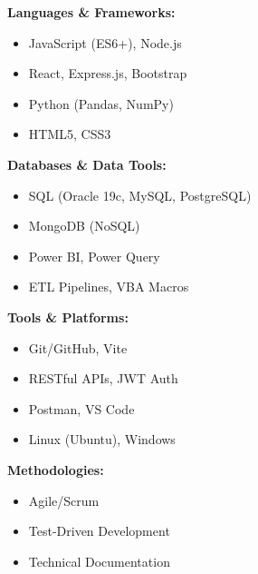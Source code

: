 \documentclass[10pt,letterpaper]{article}
\begin{document}
\vspace{0.4cm}

\vspace{0.3cm}

\noindent
\begin{minipage}[t]{0.48\textwidth}
\textbf{Languages \& Frameworks:}
\begin{itemize}
    \item JavaScript (ES6+), Node.js
    \item React, Express.js, Bootstrap
    \item Python (Pandas, NumPy)
    \item HTML5, CSS3
\end{itemize}

\vspace{0.2cm}

\textbf{Databases \& Data Tools:}
\begin{itemize}
    \item SQL (Oracle 19c, MySQL, PostgreSQL)
    \item MongoDB (NoSQL)
    \item Power BI, Power Query
    \item ETL Pipelines, VBA Macros
\end{itemize}
\end{minipage}
\hfill
\begin{minipage}[t]{0.48\textwidth}
\textbf{Tools \& Platforms:}
\begin{itemize}
    \item Git/GitHub, Vite
    \item RESTful APIs, JWT Auth
    \item Postman, VS Code
    \item Linux (Ubuntu), Windows
\end{itemize}

\vspace{0.2cm}

\textbf{Methodologies:}
\begin{itemize}
    \item Agile/Scrum
    \item Test-Driven Development
    \item Technical Documentation
\end{itemize}
\end{minipage}

\vspace{0.3cm}

\vspace{0.4cm}
\end{document}
